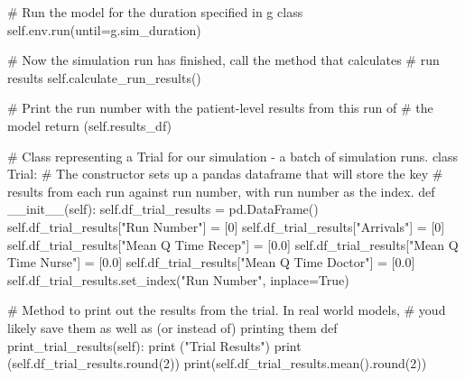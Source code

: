 \documentclass[
  letterpaper,
  DIV=11,
  numbers=noendperiod]{scrreprt}
\newenvironment{Shaded}{\begin{snugshade}}{\end{snugshade}}
\newcommand{\BuiltInTok}[1]{\textcolor[rgb]{0.00,0.23,0.31}{#1}}
\newcommand{\CommentTok}[1]{\textcolor[rgb]{0.37,0.37,0.37}{#1}}
\newcommand{\ControlFlowTok}[1]{\textcolor[rgb]{0.00,0.23,0.31}{#1}}
\newcommand{\DecValTok}[1]{\textcolor[rgb]{0.68,0.00,0.00}{#1}}
\newcommand{\FloatTok}[1]{\textcolor[rgb]{0.68,0.00,0.00}{#1}}
\newcommand{\FunctionTok}[1]{\textcolor[rgb]{0.28,0.35,0.67}{#1}}
\newcommand{\KeywordTok}[1]{\textcolor[rgb]{0.00,0.23,0.31}{#1}}
\newcommand{\NormalTok}[1]{\textcolor[rgb]{0.00,0.23,0.31}{#1}}
\newcommand{\OperatorTok}[1]{\textcolor[rgb]{0.37,0.37,0.37}{#1}}
\newcommand{\StringTok}[1]{\textcolor[rgb]{0.13,0.47,0.30}{#1}}
\newcommand{\VariableTok}[1]{\textcolor[rgb]{0.07,0.07,0.07}{#1}}
\begin{document}
\begin{tcolorbox}
\begin{Shaded}
\begin{Highlighting}[]
        \CommentTok{\# Run the model for the duration specified in g class}
        \VariableTok{self}\NormalTok{.env.run(until}\OperatorTok{=}\NormalTok{g.sim\_duration)}

        \CommentTok{\# Now the simulation run has finished, call the method that calculates}
        \CommentTok{\# run results}
        \VariableTok{self}\NormalTok{.calculate\_run\_results()}

        \CommentTok{\# Print the run number with the patient{-}level results from this run of}
        \CommentTok{\# the model}
        \ControlFlowTok{return}\NormalTok{ (}\VariableTok{self}\NormalTok{.results\_df)}

\CommentTok{\# Class representing a Trial for our simulation {-} a batch of simulation runs.}
\KeywordTok{class}\NormalTok{ Trial:}
    \CommentTok{\# The constructor sets up a pandas dataframe that will store the key}
    \CommentTok{\# results from each run against run number, with run number as the index.}
    \KeywordTok{def}  \FunctionTok{\_\_init\_\_}\NormalTok{(}\VariableTok{self}\NormalTok{):}
        \VariableTok{self}\NormalTok{.df\_trial\_results }\OperatorTok{=}\NormalTok{ pd.DataFrame()}
        \VariableTok{self}\NormalTok{.df\_trial\_results[}\StringTok{"Run Number"}\NormalTok{] }\OperatorTok{=}\NormalTok{ [}\DecValTok{0}\NormalTok{]}
        \VariableTok{self}\NormalTok{.df\_trial\_results[}\StringTok{"Arrivals"}\NormalTok{] }\OperatorTok{=}\NormalTok{ [}\DecValTok{0}\NormalTok{]}
        \VariableTok{self}\NormalTok{.df\_trial\_results[}\StringTok{"Mean Q Time Recep"}\NormalTok{] }\OperatorTok{=}\NormalTok{ [}\FloatTok{0.0}\NormalTok{]}
        \VariableTok{self}\NormalTok{.df\_trial\_results[}\StringTok{"Mean Q Time Nurse"}\NormalTok{] }\OperatorTok{=}\NormalTok{ [}\FloatTok{0.0}\NormalTok{]}
        \VariableTok{self}\NormalTok{.df\_trial\_results[}\StringTok{"Mean Q Time Doctor"}\NormalTok{] }\OperatorTok{=}\NormalTok{ [}\FloatTok{0.0}\NormalTok{]}
        \VariableTok{self}\NormalTok{.df\_trial\_results.set\_index(}\StringTok{"Run Number"}\NormalTok{, inplace}\OperatorTok{=}\VariableTok{True}\NormalTok{)}

    \CommentTok{\# Method to print out the results from the trial.  In real world models,}
    \CommentTok{\# you\textquotesingle{}d likely save them as well as (or instead of) printing them}
    \KeywordTok{def}\NormalTok{ print\_trial\_results(}\VariableTok{self}\NormalTok{):}
        \BuiltInTok{print}\NormalTok{ (}\StringTok{"Trial Results"}\NormalTok{)}
        \BuiltInTok{print}\NormalTok{ (}\VariableTok{self}\NormalTok{.df\_trial\_results.}\BuiltInTok{round}\NormalTok{(}\DecValTok{2}\NormalTok{))}
        \BuiltInTok{print}\NormalTok{(}\VariableTok{self}\NormalTok{.df\_trial\_results.mean().}\BuiltInTok{round}\NormalTok{(}\DecValTok{2}\NormalTok{))}


\end{Highlighting}
\end{Shaded}
\end{tcolorbox}
\end{document}
